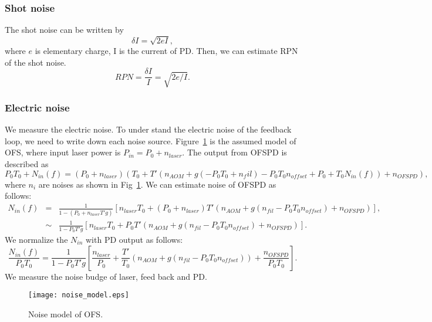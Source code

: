\subsubsection{Shot noise}
The shot noise can be written by
\begin{equation}
\delta I=\sqrt{2eI},
\end{equation}
where $e$ is elementary charge, I is the current of PD. Then, we can estimate RPN of the shot noise.
\begin{equation}
RPN=\frac{\delta I}{I}=\sqrt{2e/I}.
\end{equation}

			\begin{center}
			\end{center}
\subsubsection{Electric noise}
We measure the electric noise. To under stand the electric noise of the feedback loop, we need to write down each noise source.
Figure~\ref{fig:noise} is the assumed model of OFS, where input laser power is $P_{in}=P_0 + n_{laser}$.
The output from OFSPD is described as
\begin{equation}
P_0 T_0 +N_{in}(f) = (P_0 +n_{laser})(T_0+T'(n_{AOM}+g(-P_0 T_0+n_fil)-P_0 T_0 n_{offset} +P_0 +T_0 N_{in}(f))+n_{OFSPD}),
\end{equation}
where $n_{i}$ are noises as shown in Fig~\ref{fig:noise}. We can estimate noise of OFSPD as follows:
\begin{eqnarray}
N_{in}(f)&=&\frac{1}{1-(P_0+n_{laser}T'g)}[n_{laser}T_0 + (P_0+n_{laser})T'(n_{AOM}+g(n_{fil}-P_0T_0n_{offset})+n_{OFSPD})], \nonumber \\
&\sim&\frac{1}{1-P_0T'g}[n_{laser}T_0 + P_0T'(n_{AOM}+g(n_{fil}-P_0T_0n_{offset})+n_{OFSPD})].
\end{eqnarray}
We normalize the $N_{in}$ with PD output as follows:
\begin{equation}
\frac{N_{in}(f)}{P_0T_0}=\frac{1}{1-P_0T'g}[\frac{n_{laser}}{P_0} + \frac{T'}{T_0}(n_{AOM}+g(n_{fil}-P_0T_0n_{offset}))+\frac{n_{OFSPD}}{P_0T_0}].
\end{equation}
 We measure the noise budge of laser, feed back and PD.
\begin{figure}
\begin{center}
\texttt{[image: noise\_model.eps]}
\caption{Noise model of OFS.} 
\label{fig:noise} 
\end{center}
\end{figure}


